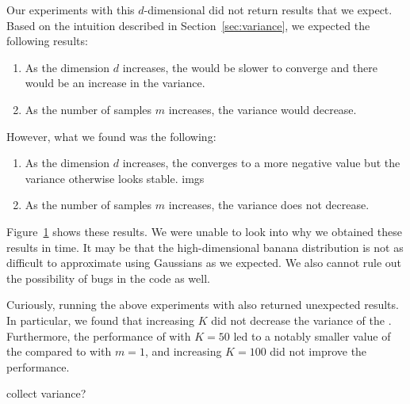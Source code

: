 \documentclass[10pt]{article}
\begin{document}
Our experiments with this $d$-dimensional did not return results that we expect. Based on the intuition described in Section~\ref{sec:variance}, we expected the following results:
\begin{enumerate}
\item
As the dimension $d$ increases, the \elbo would be slower to converge and there would be an increase in the variance.
\item
As the number of \mcmc samples $m$ increases, the \elbo variance would decrease.
\end{enumerate}
However, what we found was the following:
\begin{enumerate}
\item
As the dimension $d$ increases, the \elbo converges to a more negative value but the variance otherwise looks stable. \todo imgs
\item
As the number of \mcmc samples $m$ increases, the \elbo variance does not decrease.
\end{enumerate}
Figure~\ref{fig:uiviresults} shows these results. We were unable to look into why we obtained these results in time. It may be that the high-dimensional banana distribution is not as difficult to approximate using Gaussians as we expected. We also cannot rule out the possibility of bugs in the code as well. \todo
\\

\begin{figure}[t]
\centering
\todo
\caption{}
\label{fig:uiviresults}
\end{figure}

Curiously, running the above experiments with \sivi also returned unexpected results. In particular, we found that increasing $K$ did not decrease the variance of the \elbo. Furthermore, the performance of \sivi with $K=50$ led to a notably smaller value of the \elbo compared to \uivi with $m=1$, and increasing $K=100$ did not improve the performance.

\todo collect variance?
\\
\end{document}
